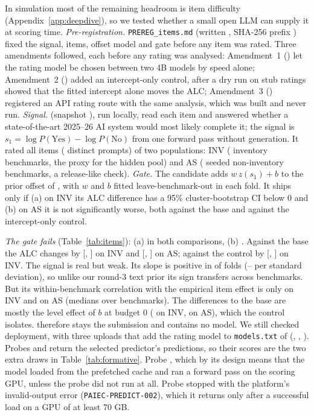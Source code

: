 \documentclass{article}
\begin{document}
In simulation most of the remaining headroom is item difficulty (Appendix~\ref{app:deepdive}), so we tested whether a small open LLM can supply it at scoring time. \emph{Pre-registration.} \texttt{PREREG\_items.md} (written \ItPreregTime, SHA-256 prefix \texttt{\ItPreregSha}) fixed the signal, items, offset model and gate before any item was rated. Three amendments followed, each before any rating was analysed: Amendment~1 (\ItAmOneTime) let the rating model be chosen between two 4B models by speed alone; Amendment~2 (\ItAmTwoTime) added an intercept-only control, after a dry run on stub ratings showed that the fitted intercept alone moves the ALC; Amendment~3 (\ItAmThreeTime) registered an API rating route with the same analysis, which was built and never run. \emph{Signal.} \ItModel{} (snapshot \texttt{\ItSnapshot}), run locally, read each item and answered whether a state-of-the-art 2025--26 AI system would most likely complete it; the signal is $s_1=\log P(\text{Yes})-\log P(\text{No})$ from one forward pass without generation. It rated all \ItNItems{} items (\ItNPrompts{} distinct prompts) of two populations: INV (\ItInvNBench{} inventory benchmarks, the proxy for the hidden pool) and AS (\ItAsNBench{} seeded non-inventory benchmarks, a release-like check). \emph{Gate.} The candidate adds $w\,z(s_1)+b$ to the prior offset of \SelId, with $w$ and $b$ fitted leave-benchmark-out in each fold. It ships only if (a) on INV its ALC difference has a 95\% cluster-bootstrap CI below 0 and (b) on AS it is not significantly worse, both against the base and against the intercept-only control.

\emph{The gate fails} (Table~\ref{tab:items}): (a) \ItGateBaseA{} in both comparisons, (b) \ItGateBaseB. Against the base the ALC changes by \ItInvSOneMean{} [\ItInvSOneLo, \ItInvSOneHi] on INV and \ItAsSOneMean{} [\ItAsSOneLo, \ItAsSOneHi] on AS; against the control by \ItInvCtrlMean{} [\ItInvCtrlLo, \ItInvCtrlHi] on INV. The signal is real but weak. Its slope is positive in \ItNFoldsWPos{} of \ItNFolds{} folds (\ItWMin--\ItWMax{} per standard deviation), so unlike our round-3 text prior its sign transfers across benchmarks. But its within-benchmark correlation with the empirical item effect is only \ItCorrInvMedian{} on INV and \ItCorrAsMedian{} on AS (medians over benchmarks). The differences to the base are mostly the level effect of $b$ at budget 0 (\ItInvSOneDBZero{} on INV, \ItAsSOneDBZero{} on AS), which the control isolates. \SelId{} therefore stays the submission and contains no model. We still checked deployment, with three uploads that add the rating model to \texttt{models.txt} of \ProbeBaseIsSel{} (\ProbeAId, \ProbeBId, \ProbeCId). Probes \ProbeAId{} and \ProbeBId{} return the selected predictor's predictions, so their scores are the two extra draws in Table~\ref{tab:formative}. Probe \ProbeBId{} \ProbeBScored, which by its design means that the model loaded from the prefetched cache and ran a forward pass on the scoring GPU, unless the probe did not run at all. Probe \ProbeCId{} stopped with the platform's invalid-output error (\texttt{PAIEC-PREDICT-002}), which it returns only after a successful load on a GPU of at least 70 GB.
\end{document}

